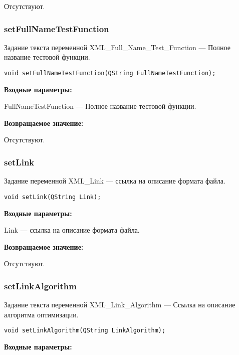 \documentclass[a4paper,12pt]{article}
\begin{document}
Отсутствуют.


\subsubsection{setFullNameTestFunction}\label{setFullNameTestFunction}

Задание текста переменной  XML\_Full\_Name\_Test\_Function --- Полное название тестовой функции.


\begin{lstlisting}[label=code_syntax_setFullNameTestFunction,caption=Синтаксис]
void setFullNameTestFunction(QString FullNameTestFunction);
\end{lstlisting}

\textbf{Входные параметры:}

FullNameTestFunction --- Полное название тестовой функции.

\textbf{Возвращаемое значение:}

Отсутствуют.


\subsubsection{setLink}\label{setLink}

Задание переменной XML\_Link --- ссылка на описание формата файла.


\begin{lstlisting}[label=code_syntax_setLink,caption=Синтаксис]
void setLink(QString Link);
\end{lstlisting}

\textbf{Входные параметры:}

Link --- ссылка на описание формата файла.

\textbf{Возвращаемое значение:}

Отсутствуют.


\subsubsection{setLinkAlgorithm}\label{setLinkAlgorithm}

Задание текста переменной  XML\_Link\_Algorithm --- Ссылка на описание алгоритма оптимизации.


\begin{lstlisting}[label=code_syntax_setLinkAlgorithm,caption=Синтаксис]
void setLinkAlgorithm(QString LinkAlgorithm);
\end{lstlisting}

\textbf{Входные параметры:}
\end{document}
